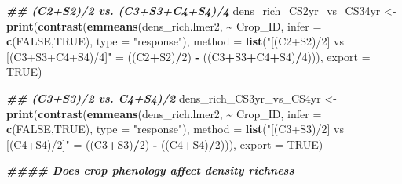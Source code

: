 \documentclass[
]{article}
\newenvironment{Shaded}{\begin{snugshade}}{\end{snugshade}}
\newcommand{\AttributeTok}[1]{\textcolor[rgb]{0.13,0.29,0.53}{#1}}
\newcommand{\ConstantTok}[1]{\textcolor[rgb]{0.56,0.35,0.01}{#1}}
\newcommand{\DecValTok}[1]{\textcolor[rgb]{0.00,0.00,0.81}{#1}}
\newcommand{\DocumentationTok}[1]{\textcolor[rgb]{0.56,0.35,0.01}{\textbf{\textit{#1}}}}
\newcommand{\FunctionTok}[1]{\textcolor[rgb]{0.13,0.29,0.53}{\textbf{#1}}}
\newcommand{\NormalTok}[1]{#1}
\newcommand{\OtherTok}[1]{\textcolor[rgb]{0.56,0.35,0.01}{#1}}
\newcommand{\SpecialCharTok}[1]{\textcolor[rgb]{0.81,0.36,0.00}{\textbf{#1}}}
\newcommand{\StringTok}[1]{\textcolor[rgb]{0.31,0.60,0.02}{#1}}
\begin{document}
\begin{Shaded}
\begin{Highlighting}[]
\DocumentationTok{\#\# (C2+S2)/2 vs. (C3+S3+C4+S4)/4}
\NormalTok{dens\_rich\_CS2yr\_vs\_CS34yr }\OtherTok{\textless{}{-}} \FunctionTok{print}\NormalTok{(}\FunctionTok{contrast}\NormalTok{(}\FunctionTok{emmeans}\NormalTok{(dens\_rich.lmer2, }\SpecialCharTok{\textasciitilde{}}\NormalTok{ Crop\_ID,}
                                                    \AttributeTok{infer =} \FunctionTok{c}\NormalTok{(}\ConstantTok{FALSE}\NormalTok{,}\ConstantTok{TRUE}\NormalTok{),}
                                                    \AttributeTok{type =} \StringTok{"response"}\NormalTok{),}
                                            \AttributeTok{method =} \FunctionTok{list}\NormalTok{(}\StringTok{"[(C2+S2)/2] vs [(C3+S3+C4+S4)/4]"} \OtherTok{=}
\NormalTok{                                                            ((C2}\SpecialCharTok{+}\NormalTok{S2)}\SpecialCharTok{/}\DecValTok{2}\NormalTok{) }\SpecialCharTok{{-}}\NormalTok{ ((C3}\SpecialCharTok{+}\NormalTok{S3}\SpecialCharTok{+}\NormalTok{C4}\SpecialCharTok{+}\NormalTok{S4)}\SpecialCharTok{/}\DecValTok{4}\NormalTok{))),}
                                   \AttributeTok{export =} \ConstantTok{TRUE}\NormalTok{)}

\DocumentationTok{\#\# (C3+S3)/2 vs. C4+S4)/2}
\NormalTok{dens\_rich\_CS3yr\_vs\_CS4yr }\OtherTok{\textless{}{-}} \FunctionTok{print}\NormalTok{(}\FunctionTok{contrast}\NormalTok{(}\FunctionTok{emmeans}\NormalTok{(dens\_rich.lmer2, }\SpecialCharTok{\textasciitilde{}}\NormalTok{ Crop\_ID,}
                                                   \AttributeTok{infer =} \FunctionTok{c}\NormalTok{(}\ConstantTok{FALSE}\NormalTok{,}\ConstantTok{TRUE}\NormalTok{),}
                                                   \AttributeTok{type =} \StringTok{"response"}\NormalTok{),}
                                           \AttributeTok{method =} \FunctionTok{list}\NormalTok{(}\StringTok{"[(C3+S3)/2] vs [(C4+S4)/2]"} \OtherTok{=} 
\NormalTok{                                                           ((C3}\SpecialCharTok{+}\NormalTok{S3)}\SpecialCharTok{/}\DecValTok{2}\NormalTok{) }\SpecialCharTok{{-}}\NormalTok{ ((C4}\SpecialCharTok{+}\NormalTok{S4)}\SpecialCharTok{/}\DecValTok{2}\NormalTok{))),}
                                  \AttributeTok{export =} \ConstantTok{TRUE}\NormalTok{)}

\DocumentationTok{\#\#\#\# Does crop phenology affect density richness }


\end{Highlighting}
\end{Shaded}
\end{document}

